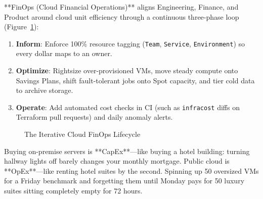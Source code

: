 **FinOps (Cloud Financial Operations)** aligns Engineering, Finance, and Product around cloud unit efficiency through a continuous three-phase loop (Figure~\ref{fig:v5-ch08-finops-loop}):
\begin{enumerate}[leftmargin=18pt]
  \item \textbf{Inform}: Enforce 100\% resource tagging (\texttt{Team}, \texttt{Service}, \texttt{Environment}) so every dollar maps to an owner.
  \item \textbf{Optimize}: Rightsize over-provisioned VMs, move steady compute onto Savings Plans, shift fault-tolerant jobs onto Spot capacity, and tier cold data to archive storage.
  \item \textbf{Operate}: Add automated cost checks in CI (such as \texttt{infracost} diffs on Terraform pull requests) and daily anomaly alerts.
\end{enumerate}

\begin{figure}[htbp]
\centering
{}
\caption{The Iterative Cloud FinOps Lifecycle}
\label{fig:v5-ch08-finops-loop}
\end{figure}

\begin{intuitionbox}
Buying on-premise servers is **CapEx**---like buying a hotel building: turning hallway lights off barely changes your monthly mortgage. Public cloud is **OpEx**---like renting hotel suites by the second. Spinning up 50 oversized VMs for a Friday benchmark and forgetting them until Monday pays for 50 luxury suites sitting completely empty for 72 hours.
\end{intuitionbox}


